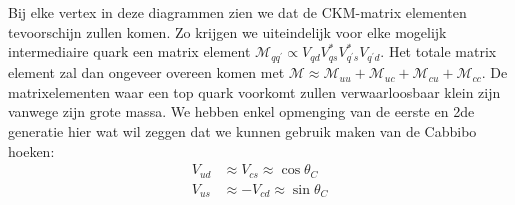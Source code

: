 \documentclass[../main.tex]{subfiles}
\begin{document}
\begin{minipage}[c]{0.5\textwidth}
    \begin{center}
    \end{center}
\end{minipage}
Bij elke vertex in deze diagrammen zien we dat de CKM-matrix elementen tevoorschijn zullen komen. Zo krijgen we uiteindelijk voor elke mogelijk intermediaire quark een matrix element $\mathcal{M}_{q q^{\prime}} \propto V_{q d} V_{q s}^{*} V_{q^{\prime} s}^{*} V_{q^{\prime} d}$. Het totale matrix element zal dan ongeveer overeen komen met $\mathcal{M} \approx \mathcal{M}_{u u}+\mathcal{M}_{u c}+\mathcal{M}_{c u}+\mathcal{M}_{c c}$. De matrixelementen waar een top quark voorkomt zullen verwaarloosbaar klein zijn vanwege zijn grote massa. We hebben enkel opmenging van de eerste en 2de generatie hier wat wil zeggen dat we kunnen gebruik maken van de Cabbibo hoeken:
\begin{equation}
    \begin{aligned}
        \label{eq:cab_hoeken}
        V_{u d} &\approx V_{c s} \approx \cos \theta_{C} \\
        V_{u s} &\approx-V_{c d} \approx \sin \theta_{C}
    \end{aligned}
\end{equation}
\end{document}
